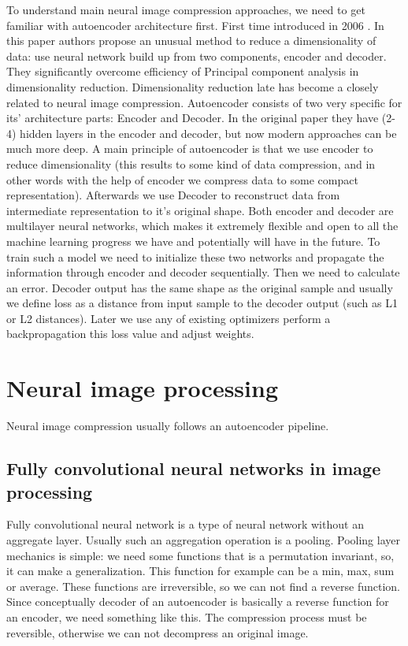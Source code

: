 To understand main neural image compression approaches, we need to get familiar with autoencoder architecture first. First time introduced in 2006 \cite{Autoencoder_2006}. In this paper authors propose an unusual method to reduce a dimensionality of data: use neural network build up from two components, encoder and decoder. They significantly overcome efficiency of Principal component analysis \cite{pca} in dimensionality reduction. Dimensionality reduction late has become a closely related to neural image compression. Autoencoder consists of two very specific for its' architecture parts: Encoder and Decoder. In the original paper they have (2-4) hidden layers in the encoder and decoder, but now modern approaches can be much more deep. A main principle of autoencoder is that we use encoder to reduce dimensionality (this results to some kind of data compression, and in other words with the help of encoder we compress data to some compact representation). Afterwards we use Decoder to reconstruct data from intermediate representation to it's original shape. Both encoder and decoder are multilayer neural networks, which makes it extremely flexible and open to all the machine learning progress we have and potentially will have in the future. To train such a model we need to initialize these two networks and propagate the information through encoder and decoder sequentially. Then we need to calculate an error. Decoder output has the same shape as the original sample and usually we define loss as a distance from input sample to the decoder output (such as L1 or L2 distances). Later we use any of existing optimizers perform a backpropagation this loss value and adjust weights.

\section{Neural image processing}

Neural image compression usually follows an autoencoder pipeline.

\subsection{Fully convolutional neural networks in image processing}

Fully convolutional neural network is a type of neural network without an aggregate layer. Usually such an aggregation operation is a pooling. Pooling layer mechanics is simple: we need some functions that is a permutation invariant, so, it can make a generalization. This function for example can be a min, max, sum or average. These functions are irreversible, so we can not find a reverse function. Since conceptually decoder of an autoencoder is basically a reverse function for an encoder, we need something like this. The compression process must be reversible, otherwise we can not decompress an original image.

